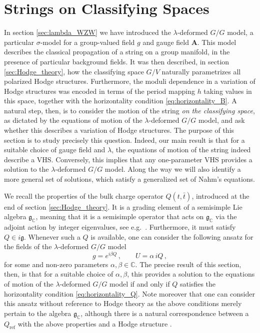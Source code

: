 \documentclass[11pt,a4paper]{article}
\numberwithin{equation}{section}
\numberwithin{table}{section}\setlength{\multlinegap}{25pt}
\begin{document}
\section{Strings on Classifying Spaces}
\label{sec:strings_Hodge_theory}

In section \ref{sec:lambda_WZW} we have introduced the $\lambda$-deformed $G/G$ model, a particular $\sigma$-model for a group-valued field $g$ and gauge field $\mathbf{A}$. This model describes the classical propagation of a string on a group manifold, in the presence of particular background fields. It was then described, in section \ref{sec:Hodge_theory}, how the classifying space $G/V$ naturally parametrizes all polarized Hodge structures. Furthermore, the moduli dependence in a variation of Hodge structures was encoded in terms of the period mapping $h$ taking values in this space, together with the horizontality condition \eqref{eq:horizontality_B}. A natural step, then, is to consider the motion of the string \textit{on the classifying space}, as dictated by the equations of motion of the $\lambda$-deformed $G/G$ model, and ask whether this describes a variation of Hodge structures. The purpose of this section is to study precisely this question. Indeed, our main result is that for a suitable choice of gauge field and $\lambda$, the equations of motion of the string indeed describe a VHS. Conversely, this implies that any one-parameter VHS provides a solution to the $\lambda$-deformed $G/G$ model. Along the way we will also identify a more general set of solutions, which satisfy a generalized set of Nahm's equations.

We recall the properties of the bulk charge operator $Q(t,\bar{t})$, introduced at the end of section \ref{sec:Hodge_theory}. It is a grading element of a semisimple Lie algebra $\mathfrak{g}_\mathbb{C}$, meaning that it is a semisimple operator that acts on $\mathfrak{g}_{\mathbb{C}}$ via the adjoint action by integer eigenvalues, see e.g.~\cite{Kerr2017}. Furthermore, it must satisfy $Q\in i \mathfrak{g}$. Whenever such a $Q$ is available, one can consider the following ansatz for the fields of the $\lambda$-deformed $G/G$ model
\begin{equation}\label{eq:ansatz}
	g = e^{i\beta Q}\,,\qquad U = \alpha\, iQ\,,
\end{equation}
for some and non-zero parameters $\alpha,\beta\in\mathbb{C}$. The precise result of this section, then, is that for a suitable choice of $\alpha,\beta$, this provides a solution to the equations of motion of the $\lambda$-deformed $G/G$ model if and only if $Q$ satisfies the horizontality condition \eqref{eq:horizontality_Q}.  Note moreover that one can consider this ansatz without reference to Hodge theory as the above conditions merely pertain to the algebra $\mathfrak{g}_{\mathbb{C}}$, although there is a natural correspondence between a $Q_{\mathrm{ref}}$ with the above properties and a Hodge structure \cite{robles2012schubert}.
\end{document}
